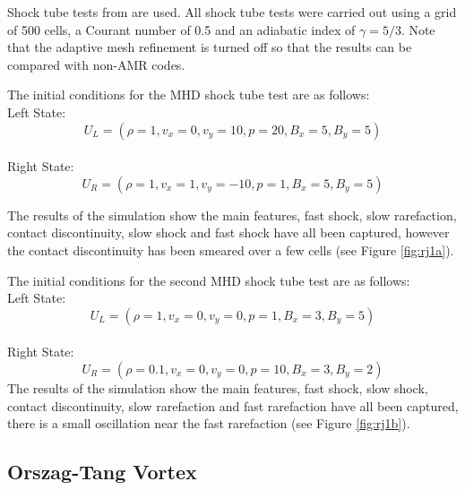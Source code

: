 Shock tube tests from \citet{1995ApJ...442..228R} are used.
All shock tube tests were carried out using a grid of 500 cells, a Courant number of 0.5 and an adiabatic index of $\gamma=5/3$.
Note that the adaptive mesh refinement is turned off so that the results can be compared with non-AMR codes. 

The initial conditions for the MHD shock tube test are as follows:
\\Left State:
\begin{equation}
U_L = \left( 
\rho = 1,
v_x =0,
v_y = 10,
p = 20,
B_x = 5,
B_y = 5
\right)
\end{equation}
\\Right State:
\begin{equation}
U_R = \left( 
\rho = 1,
v_x = 1,
v_y = -10,
p = 1,
B_x = 5,
B_y = 5
\right)
\end{equation}


The results of the simulation show the main features, fast shock, slow rarefaction, contact discontinuity, slow shock and fast shock have all been captured, however the contact discontinuity has been smeared over a few cells (see Figure \ref{fig:rj1a}).


The initial conditions for the second MHD shock tube test are as follows:
\\Left State:
\begin{equation}
U_L = \left( 
\rho = 1,
v_x =0,
v_y = 0,
p = 1,
B_x = 3,
B_y = 5
\right)
\end{equation}
\\Right State:
\begin{equation}
U_R = \left( 
\rho = 0.1,
v_x = 0,
v_y = 0,
p = 10,
B_x = 3,
B_y = 2
\right)
\end{equation}
The results of the simulation show the main features, fast shock, slow shock, contact discontinuity, slow rarefaction and fast rarefaction have all been captured, there is a small oscillation near the fast rarefaction (see Figure \ref{fig:rj1b}).

\subsection{Orszag-Tang Vortex}


